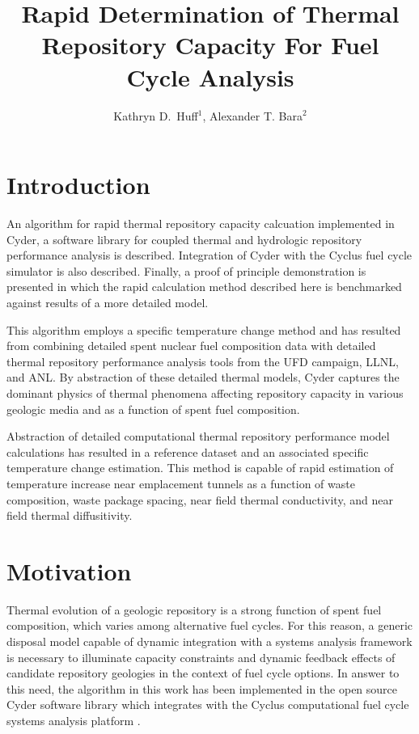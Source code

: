 \documentclass{anstrans}
\title{Rapid Determination of Thermal Repository Capacity For Fuel Cycle Analysis}
\author{Kathryn D.~Huff$^1$, Alexander T. Bara$^2$}
\institute{$^1$Univ. of Wisconsin, 1500 Engineering Dr., Madison, WI, 53706\\ 
\& Argonne National Laboratory, 9700 S. Cass Ave., Lemont, IL, katyhuff@gmail.com\\
$^2$Univ. of Illinois, Urbana Champaign, IL, 61801, bara1@illinois.edu}
\date{}
\begin{document}
\section{Introduction}

An algorithm for rapid thermal repository capacity calcuation implemented in Cyder, a 
software library for coupled thermal and hydrologic repository performance 
analysis is described. Integration of Cyder with the Cyclus fuel cycle simulator 
is also described. Finally, a proof of principle demonstration is presented in 
which the rapid calculation method described here is benchmarked against results 
of a more detailed model.

This algorithm employs a specific temperature change method \cite{radel} and has 
resulted from combining detailed spent nuclear fuel composition data with 
detailed thermal repository performance analysis tools from the \gls{UFD} 
campaign, \gls{LLNL}, and \gls{ANL}\cite{radel,llnl,sinda,carter}. By 
abstraction of these detailed thermal models, Cyder captures the dominant 
physics of thermal phenomena affecting repository capacity in various geologic 
media and as a function of spent fuel composition.

Abstraction of detailed computational thermal repository performance model 
calculations has resulted in a reference dataset and an associated specific 
temperature change estimation. This method is capable of rapid estimation of 
temperature increase near emplacement tunnels as a function of waste 
composition, waste package spacing, near field thermal conductivity, and near 
field thermal diffusitivity. 

\section{Motivation}

Thermal evolution of a geologic repository is a strong function of spent fuel 
composition, which varies among alternative fuel cycles. For this reason, a 
generic disposal model capable of dynamic integration with a systems analysis 
framework is necessary to illuminate capacity constraints and dynamic feedback 
effects of candidate repository geologies in the context of fuel cycle options.
In answer to this need, the algorithm in this work has been implemented in the 
open source Cyder software library which integrates with the Cyclus computational 
fuel cycle systems analysis platform \cite{huff_cyder_2012,huff_cyclus:_2010}. 
\end{document}
